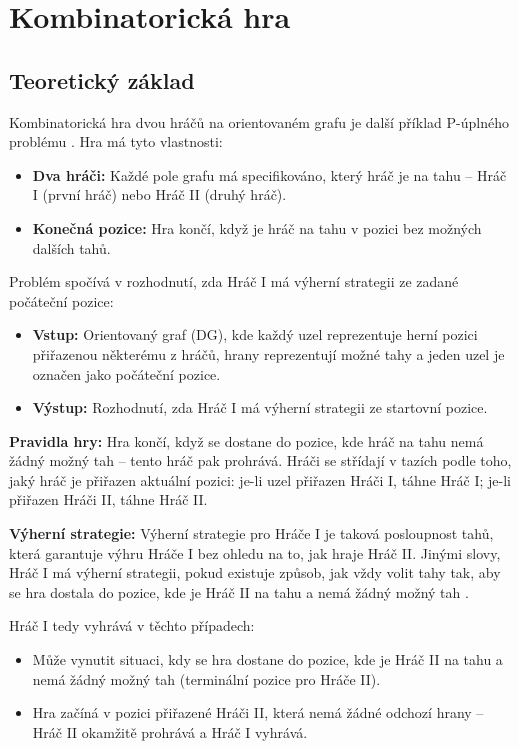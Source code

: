 \chapter{Kombinatorická hra}
\label{sec:Games}

\section{Teoretický základ}
\label{sec:GamesTheory}

Kombinatorická hra dvou hráčů na orientovaném grafu je další příklad P-úplného problému \cite{sawa}. Hra má tyto vlastnosti:

\begin{itemize}
    \item \textbf{Dva hráči:} Každé pole grafu má specifikováno, který hráč je na tahu – Hráč I (první hráč) nebo Hráč II (druhý hráč).
    \item \textbf{Konečná pozice:} Hra končí, když je hráč na tahu v pozici bez možných dalších tahů.
\end{itemize}

Problém spočívá v rozhodnutí, zda Hráč I má výherní strategii ze zadané počáteční pozice:

\begin{itemize}
    \item \textbf{Vstup:} Orientovaný graf (DG), kde každý uzel reprezentuje herní pozici přiřazenou některému z hráčů, hrany reprezentují možné tahy a jeden uzel je označen jako počáteční pozice.
    \item \textbf{Výstup:} Rozhodnutí, zda Hráč I má výherní strategii ze startovní pozice.
\end{itemize}

\textbf{Pravidla hry:} Hra končí, když se dostane do pozice, kde hráč na tahu nemá žádný možný tah – tento hráč pak prohrává. Hráči se střídají v tazích podle toho, jaký hráč je přiřazen aktuální pozici: je-li uzel přiřazen Hráči I, táhne Hráč I; je-li přiřazen Hráči II, táhne Hráč II.

\textbf{Výherní strategie:} Výherní strategie pro Hráče I je taková posloupnost tahů, která garantuje výhru Hráče I bez ohledu na to, jak hraje Hráč II. Jinými slovy, Hráč I má výherní strategii, pokud existuje způsob, jak vždy volit tahy tak, aby se hra dostala do pozice, kde je Hráč II na tahu a nemá žádný možný tah \cite{sawa}.

Hráč I tedy vyhrává v těchto případech:
\begin{itemize}
    \item Může vynutit situaci, kdy se hra dostane do pozice, kde je Hráč II na tahu a nemá žádný možný tah (terminální pozice pro Hráče II).
    \item Hra začíná v pozici přiřazené Hráči II, která nemá žádné odchozí hrany – Hráč II okamžitě prohrává a Hráč I vyhrává.
\end{itemize}

